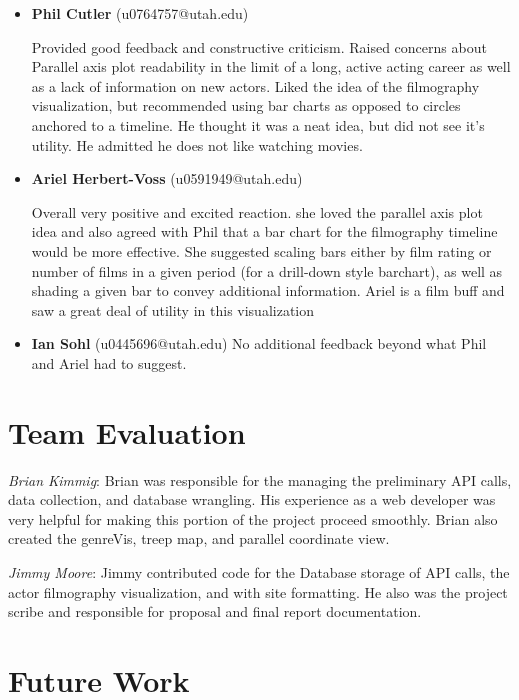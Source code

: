 \documentclass[12pt]{article}
\begin{document}
\begin{itemize}
	\item \textbf{Phil Cutler} (u0764757@utah.edu)
	
	Provided good feedback and constructive criticism. Raised concerns about Parallel axis plot readability in the limit of a long, active acting career as well as a lack of information on new actors. Liked the idea of the filmography visualization, but recommended using bar charts as opposed to circles anchored to a timeline. He thought it was a neat idea, but did not see it's utility. He admitted he does not like watching movies.
	
	
	\item \textbf{Ariel Herbert-Voss} (u0591949@utah.edu)
	
	Overall very positive and excited reaction. she loved the parallel axis plot idea and also agreed with Phil that a bar chart for the filmography timeline would be more effective. She suggested scaling bars either by film rating or number of films in a given period (for a drill-down style barchart), as well as shading a given bar to convey additional information. Ariel is a film buff and saw a great deal of utility in this visualization
	
	\item \textbf{Ian Sohl} (u0445696@utah.edu)
		No additional feedback beyond what Phil and Ariel had to suggest.
\end{itemize}

\newpage

\section{Team Evaluation}

\textit{Brian Kimmig}: Brian was responsible for the managing the preliminary API calls, data collection, and database wrangling. His experience as a web developer was very helpful for making this portion of the project proceed smoothly. Brian also created  the genreVis, treep map, and parallel coordinate view.

\textit{Jimmy Moore}: Jimmy contributed code for the Database storage of API calls, the actor filmography visualization, and with site formatting.  He also was the project scribe and responsible for proposal and final report documentation.

\newpage

\section{Future Work}
\end{document}
